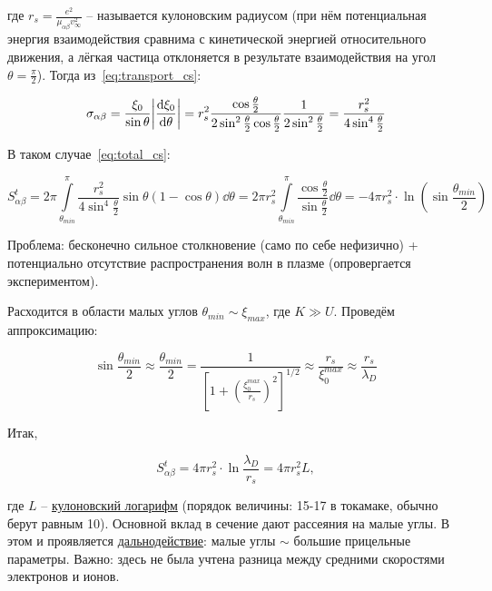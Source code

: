 \documentclass[10pt, a4paper]{article}
\begin{document}
где $r_s = \frac{e^2}{\mu_{\alpha\beta}v_\infty^2}$ -- называется кулоновским радиусом (при нём потенциальная энергия взаимодействия сравнима с кинетической энергией относительного движения, а лёгкая частица отклоняется в результате взаимодействия на угол $\theta=\frac{\pi}{2}$\cite{raizer}). Тогда из~\eqref{eq:transport_cs}:

\begin{equation*}
	\sigma_{\alpha\beta} = \frac{\xi_0}{\sin\theta}\abs{\dv{\xi_0}{\theta}} = r_s^2\frac{\cos\frac{\theta}{2}}{2\sin^2\frac{\theta}{2}\cos\frac{\theta}{2}}\frac{1}{2\sin^2\frac{\theta}{2}} = \frac{r_s^2}{4\sin^4\frac{\theta}{2}}
\end{equation*}

В таком случае~\eqref{eq:total_cs}:

\begin{equation*}
	S_{\alpha\beta}^t = 2\pi\int\limits_{\theta_{min}}^{\pi}\frac{r_s^2}{4\sin^4\frac{\theta}{2}}\sin\theta(1-\cos\theta)\dd\theta = 2\pi r_s^2\int\limits_{\theta_{min}}^{\pi} \frac{\cos\frac{\theta}{2}}{\sin\frac{\theta}{2}}\dd\theta = -4\pi r_s^2 \cdot \ln\left( \sin\frac{\theta_{min}}{2}\right) 
\end{equation*}

Проблема: бесконечно сильное столкновение (само по себе нефизично) + потенциально отсутствие распространения волн в плазме (опровергается экспериментом).

Расходится в области малых углов $\theta_{min}\sim\xi_{max}$, где $K\gg U$. Проведём аппроксимацию:

\begin{equation*}
	\sin\frac{\theta_{min}}{2}\approx \frac{\theta_{min}}{2} = \frac{1}{\left[ 1+\left( \frac{\xi_0^{max}}{r_s}\right)^2 \right]^{1/2}} \approx \frac{r_s}{\xi_0^{max}} \approx \frac{r_s}{\lambda_D}
\end{equation*}

Итак, 

\begin{equation*}
	S_{\alpha\beta}^t = 4\pi r_s^2 \cdot \ln\frac{\lambda_D}{r_s} = 4\pi r_s^2 L,
\end{equation*}

где $L$ -- \uline{кулоновский логарифм} (порядок величины: 15-17 в токамаке, обычно берут равным 10). Основной вклад в сечение дают рассеяния на малые углы. В этом и проявляется \uline{дальнодействие}: малые углы $\sim$ большие прицельные параметры. Важно: здесь не была учтена разница между средними скоростями электронов и ионов.
\end{document}

